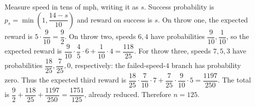 Measure speed in tens of mph, writing it as $s$. Success probability is $p_s=\min(1,\dfrac{14-s}{10})$ and reward on success is $s$. On throw one, the expected reward is $5\cdot\dfrac{9}{10}=\dfrac{9}{2}$. On throw two, speeds $6,4$ have probabilities $\dfrac{9}{10},\dfrac{1}{10}$, so the expected reward is $\dfrac{9}{10}\cdot\dfrac{4}{5}\cdot6+\dfrac{1}{10}\cdot4=\dfrac{118}{25}$. For throw three, speeds $7,5,3$ have probabilities $\dfrac{18}{25},\dfrac{7}{25},0$, respectively: the failed-speed-$4$ branch has probability zero. Thus the expected third reward is $\dfrac{18}{25}\cdot\dfrac{7}{10}\cdot7+\dfrac{7}{25}\cdot\dfrac{9}{10}\cdot5=\dfrac{1197}{250}$. The total is $\dfrac{9}{2}+\dfrac{118}{25}+\dfrac{1197}{250}=\dfrac{1751}{125}$, already reduced. Therefore $\boxed{n=125}$.
